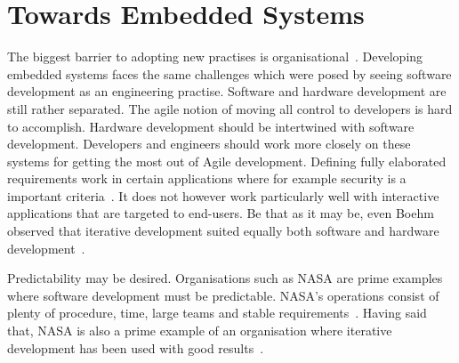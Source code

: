 \documentclass[english]{tktltiki2}
\begin{document}

\section{Towards Embedded Systems}

The biggest barrier to adopting new practises is organisational~\cite{Pop02}. Developing embedded systems faces the same challenges which were posed by seeing software development as an engineering practise. Software and hardware development are still rather separated. The agile notion of moving all control to developers is hard to accomplish. Hardware development should be intertwined with software development. Developers and engineers should work more closely on these systems for getting the most out of Agile development. Defining fully elaborated requirements work in certain applications where for example security is a important criteria~\cite{Boe88}. It does not however work particularly well with interactive applications that are targeted to end-users. Be that as it may be, even Boehm observed that iterative development suited equally both software and hardware development~\cite{Boe88}.

Predictability may be desired. Organisations such as NASA are prime examples where software development must be predictable. NASA’s operations consist of plenty of procedure, time, large teams and stable requirements~\cite{Fow05}. Having said that, NASA is also a prime example of an organisation where iterative development has been used with good results~\cite{LB03}.
\end{document}
